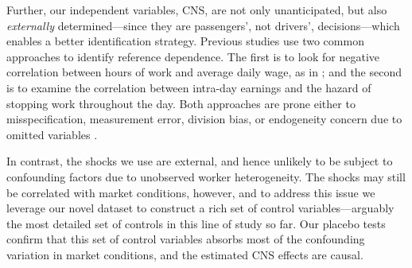 \documentclass[reviewmode,AEJ]{AEA}
\begin{document}
Further, our independent variables, CNS, are not only unanticipated, but also \textit{externally} 
determined---since they are passengers', not drivers', decisions---which enables a better identification
strategy. Previous studies use two common approaches to identify reference dependence. The first is to
look for negative correlation between hours of work and average daily wage, as in \citet{camerer1997labor}; %
and the second  is to examine the correlation between intra-day earnings and the hazard of stopping work throughout the day. 
Both approaches are prone either to misspecification, measurement error, division bias, or endogeneity concern due to omitted variables \citep{oettinger1999empirical, farber2005tomorrow}. 

In contrast, the shocks we use %
are external, and hence unlikely to be subject to confounding factors 
due to unobserved worker heterogeneity. The shocks may still be correlated with market conditions, however, 
and to address this issue we leverage our novel dataset to construct a rich set of control variables---arguably 
the most detailed set of controls in this line of study so far. 
Our placebo tests confirm that this set of control variables absorbs most of the confounding variation in market conditions, and the estimated CNS effects are causal.
\end{document}
